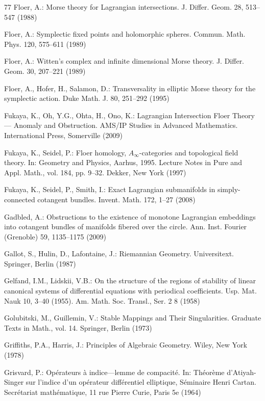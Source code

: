 \begin{thebibliography}{77}
 Floer, A.: Morse theory for Lagrangian intersections. J. Differ. Geom. 28, 513–547 (1988)

 Floer, A.: Symplectic fixed points and holomorphic spheres. Commun. Math. Phys. 120, 575–611 (1989)

 Floer, A.: Witten’s complex and infinite dimensional Morse theory. J. Differ. Geom. 30, 207–221 (1989)

 Floer, A., Hofer, H., Salamon, D.: Transversality in elliptic Morse theory for the symplectic action. Duke Math. J. 80, 251–292 (1995)

 Fukaya, K., Oh, Y.G., Ohta, H., Ono, K.: Lagrangian Intersection Floer Theory— Anomaly and Obstruction. AMS/IP Studies in Advanced Mathematics. International Press, Somerville (2009)

 Fukaya, K., Seidel, P.: Floer homology, \ensuremath{A_\infty}-categories and topological field theory. In: Geometry and Physics, Aarhus, 1995. Lecture Notes in Pure and Appl. Math., vol. 184, pp. 9–32. Dekker, New York (1997)

 Fukaya, K., Seidel, P., Smith, I.: Exact Lagrangian submanifolds in simply-connected cotangent bundles. Invent. Math. 172, 1–27 (2008)

 Gadbled, A.: Obstructions to the existence of monotone Lagrangian embeddings into cotangent bundles of manifolds fibered over the circle. Ann. Inst. Fourier (Grenoble) 59, 1135–1175 (2009)

 Gallot, S., Hulin, D., Lafontaine, J.: Riemannian Geometry. Universitext. Springer, Berlin (1987)

 Gelfand, I.M., Lidskii, V.B.: On the structure of the regions of stability of linear canonical systems of differential equations with periodical coefficients. Usp. Mat. Nauk 10, 3–40 (1955). Am. Math. Soc. Transl., Ser. 2 8 (1958)

 Golubitski, M., Guillemin, V.: Stable Mappings and Their Singularities. Graduate Texts in Math., vol. 14. Springer, Berlin (1973)

 Griffiths, P.A., Harris, J.: Principles of Algebraic Geometry. Wiley, New York (1978)

 Grisvard, P.: Opérateurs à indice—lemme de compacité. In: Théorème d’Atiyah-Singer sur l’indice d’un opérateur différentiel elliptique, Séminaire Henri Cartan. Secrétariat mathématique, 11 rue Pierre Curie, Paris 5e (1964)


\end{thebibliography}
